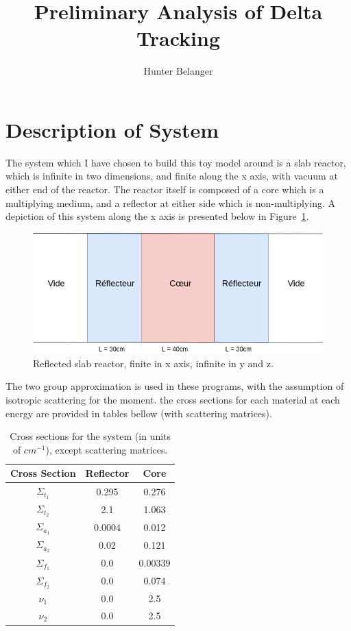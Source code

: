 \documentclass{article}
\author{Hunter Belanger}
\title{Preliminary Analysis of Delta Tracking}
\date{}
\begin{document}
	\maketitle
	
	\section{Description of System}
	 The system which I have chosen to build this toy model around is a slab reactor, which is infinite in two dimensions, and finite along the x axis, with vacuum at either end of the reactor. The reactor itself is composed of a core which is a multiplying medium, and a reflector at either side which is non-multiplying. A depiction of this system along the x axis is presented below in Figure~\ref{fig:réacteur}.
	
	\begin{figure}
		\centering
		\includegraphics[scale=0.45]{reacteur.png}
		\caption{Reflected slab reactor, finite in x axis, infinite in y and z.}
		\label{fig:réacteur}
	\end{figure}
	
	The two group approximation is used in these programs, with the assumption of isotropic scattering for the moment. the cross sections for each material at each energy are provided in tables bellow (with scattering matrices).
	
	\begin{table}
		\centering
		\begin{tabular}{|c|c|c|}
			\hline
			\textbf{Cross Section} & \textbf{Reflector} & \textbf{Core} \\ 
			\hline \hline
			$\Sigma_{t_1}$ & 0.295 & 0.276 \\
			$\Sigma_{t_2}$ & 2.1 & 1.063 \\
			\hline
			$\Sigma_{a_1}$ & 0.0004 & 0.012 \\
			$\Sigma_{a_2}$ & 0.02 & 0.121 \\
			\hline
			$\Sigma_{f_1}$ & 0.0 & 0.00339 \\
			$\Sigma_{f_2}$ & 0.0 & 0.074 \\
			\hline
			$\nu_1$ & 0.0 & 2.5 \\
			$\nu_2$ & 0.0 & 2.5 \\
			\hline
		\end{tabular}
		\caption{Cross sections for the system (in units of $cm^{-1}$), except scattering matrices.}
	\end{table}
	
\end{document}
